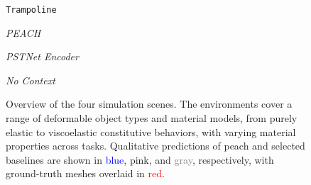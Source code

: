 \begin{figure}[t]
    \begin{minipage}{0.3\textwidth}
        \centering
        {\small \texttt{Trampoline }}
    \end{minipage}
    \begin{minipage}{0.2\textwidth}
        \centering
        {\small \hspace{0.6cm} \textit{PEACH}}
    \end{minipage}
    \begin{minipage}{0.23\textwidth}
        \centering
        {\small \hspace{0.8cm}\textit{PSTNet Encoder}}
    \end{minipage}
    \begin{minipage}{0.23\textwidth}
        \centering
        {\small \hspace{0.5cm} \textit{No Context}}
    \end{minipage}
    


\caption{
    Overview of the four simulation scenes.
    The environments cover a range of deformable object types and material models, from purely elastic to viscoelastic constitutive behaviors, with varying material properties across tasks.
    Qualitative predictions of \gls{peach} and selected baselines are shown in \textcolor{blue}{blue}, \textcolor{TabPink}{pink}, and \textcolor{gray}{gray}, respectively, with ground-truth meshes overlaid in \textcolor{red}{red}.
}
\vspace{-0.6cm}
\label{fig:task_overview}
\end{figure}
